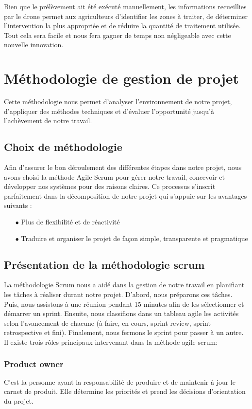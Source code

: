 Bien que le prélèvement ait été exécuté manuellement, les informations recueillies par le drone permet aux agriculteurs d'identifier les zones à traiter, de déterminer l'intervention la plus appropriée et de réduire la quantité de traitement utilisée. Tout cela sera facile et nous fera gagner de temps non négligeable avec cette nouvelle innovation.



\section[Methodologie]{Méthodologie de gestion de projet }
Cette méthodologie nous permet d'analyser l'environnement de notre projet, d'appliquer des méthodes techniques et d'évaluer l'opportunité jusqu'à l'achèvement de notre travail.
\subsection{Choix de méthodologie }
Afin d'assurer le bon déroulement des différentes étapes dans notre projet, nous avons choisi la méthode Agile Scrum pour gérer notre travail, concevoir et développer nos systèmes pour des raisons claires. Ce processus  s'inscrit parfaitement dans la décomposition de notre projet qui s'appuie sur les avantages suivants :
\begin{itemize}
	\item[$\bullet$] Plus de flexibilité et de réactivité
	\item[$\bullet$] Traduire et organiser le projet de façon simple, transparente et pragmatique
\end{itemize}

\subsection{Présentation de la méthodologie scrum }
La méthodologie Scrum nous a aidé dans la gestion de notre travail en planifiant les tâches à réaliser durant notre projet. D'abord, nous préparons ces tâches. Puis, nous assistons à une réunion pendant 15 minutes afin de les sélectionner et démarrer un sprint. Ensuite, nous classifions dans un tableau agile les activités selon l'avancement de chacune (à faire, en cours, sprint review, sprint retrospective et fini). Finalement, nous fermons le sprint pour passer à un autre.
Il existe trois rôles principaux intervenant dans la méthode agile scrum:
\subsubsection{Product owner }
C'est la personne ayant la responsabilité de produire et de maintenir à jour le carnet de produit. Elle détermine les priorités et prend les décisions d'orientation du projet.
